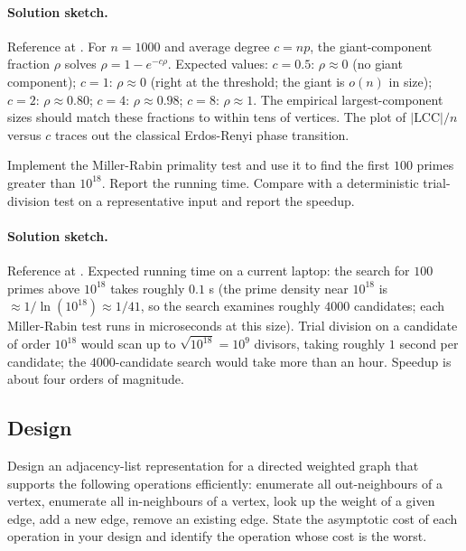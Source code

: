 \paragraph{Solution sketch.}
Reference at
.
For $n = 1000$ and average degree $c = np$, the giant-component
fraction $\rho$ solves $\rho = 1 - e^{-c \rho}$. Expected values:
$c = 0.5$: $\rho \approx 0$ (no giant component);
$c = 1$: $\rho \approx 0$ (right at the threshold; the giant is
$o(n)$ in size);
$c = 2$: $\rho \approx 0.80$;
$c = 4$: $\rho \approx 0.98$;
$c = 8$: $\rho \approx 1$. The empirical largest-component sizes
should match these fractions to within tens of vertices. The plot
of $|\text{LCC}| / n$ versus $c$ traces out the classical Erdos-Renyi
phase transition.

\begin{exercise}
Implement the Miller-Rabin primality test and use it to find the
first $100$ primes greater than $10^{18}$. Report the running time.
Compare with a deterministic trial-division test on a
representative input and report the speedup.
\end{exercise}

\paragraph{Solution sketch.}
Reference at
.
Expected running time on a current laptop: the search for $100$
primes above $10^{18}$ takes roughly $0.1$ s (the prime density
near $10^{18}$ is $\approx 1/\ln(10^{18}) \approx 1/41$, so the
search examines roughly $4000$ candidates; each Miller-Rabin test
runs in microseconds at this size). Trial division on a candidate
of order $10^{18}$ would scan up to $\sqrt{10^{18}} = 10^{9}$
divisors, taking roughly $1$ second per candidate; the
$4000$-candidate search would take more than an hour. Speedup is
about four orders of magnitude.

\subsection*{Design}

\begin{exercise}
Design an adjacency-list representation for a directed weighted
graph that supports the following operations efficiently: enumerate
all out-neighbours of a vertex, enumerate all in-neighbours of a
vertex, look up the weight of a given edge, add a new edge, remove
an existing edge. State the asymptotic cost of each operation in
your design and identify the operation whose cost is the worst.
\end{exercise}

